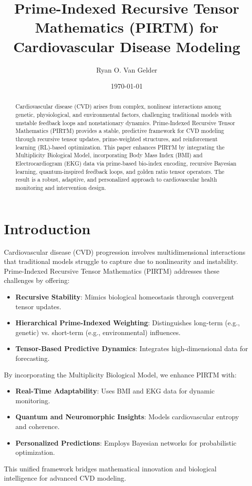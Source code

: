 \documentclass{article}
\theoremstyle{plain}
\theoremstyle{claimstyle}
\begin{document}
\title{Prime-Indexed Recursive Tensor Mathematics (PIRTM) for Cardiovascular Disease Modeling}
\author{Ryan O. Van Gelder} 
\date{\today}



\maketitle

\begin{abstract}
Cardiovascular disease (CVD) arises from complex, nonlinear interactions among genetic, physiological, and environmental factors, challenging traditional models with unstable feedback loops and nonstationary dynamics. Prime-Indexed Recursive Tensor Mathematics (PIRTM) provides a stable, predictive framework for CVD modeling through recursive tensor updates, prime-weighted structures, and reinforcement learning (RL)-based optimization. This paper enhances PIRTM by integrating the Multiplicity Biological Model, incorporating Body Mass Index (BMI) and Electrocardiogram (EKG) data via prime-based bio-index encoding, recursive Bayesian learning, quantum-inspired feedback loops, and golden ratio tensor operators. The result is a robust, adaptive, and personalized approach to cardiovascular health monitoring and intervention design.
\end{abstract}

\section{Introduction}
Cardiovascular disease (CVD) progression involves multidimensional interactions that traditional models struggle to capture due to nonlinearity and instability. Prime-Indexed Recursive Tensor Mathematics (PIRTM) addresses these challenges by offering:
\begin{itemize}
    \item \textbf{Recursive Stability}: Mimics biological homeostasis through convergent tensor updates.
    \item \textbf{Hierarchical Prime-Indexed Weighting}: Distinguishes long-term (e.g., genetic) vs. short-term (e.g., environmental) influences.
    \item \textbf{Tensor-Based Predictive Dynamics}: Integrates high-dimensional data for forecasting.
\end{itemize}
By incorporating the Multiplicity Biological Model, we enhance PIRTM with:
\begin{itemize}
    \item \textbf{Real-Time Adaptability}: Uses BMI and EKG data for dynamic monitoring.
    \item \textbf{Quantum and Neuromorphic Insights}: Models cardiovascular entropy and coherence.
    \item \textbf{Personalized Predictions}: Employs Bayesian networks for probabilistic optimization.
\end{itemize}
This unified framework bridges mathematical innovation and biological intelligence for advanced CVD modeling.
\end{document}
